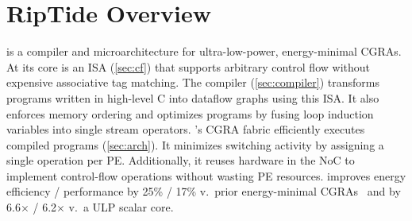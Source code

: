 \section{RipTide Overview}
\label{sec:overview}


\riptide is a compiler and microarchitecture for ultra-low-power, energy-minimal CGRAs.
%
At its core is an ISA (\autoref{sec:cf}) that supports arbitrary control flow without expensive associative tag matching.
% 
The compiler (\autoref{sec:compiler}) transforms programs written in high-level C into dataflow graphs using this ISA.
% 
It also enforces memory ordering and optimizes programs by fusing loop induction variables into single stream operators.
% 
\riptide's CGRA fabric efficiently executes compiled programs (\autoref{sec:arch}).
% 
It minimizes switching activity by assigning a single operation per PE.
% 
Additionally, it reuses hardware in the NoC to implement control-flow operations without wasting PE resources.
% 
\riptide improves energy efficiency / performance
by 25\% / 17\% v.\ prior
energy-minimal CGRAs~\cite{snafu} and by 6.6$\times$ / 6.2$\times$
v.\ a ULP scalar core.

% 
% 
% 

%
%
% 


